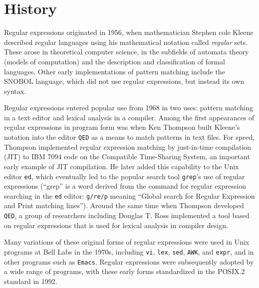 \chapter{History}
\label{chap:history}

Regular expressions originated in 1956, when mathematician Stephen
cole Kleene described regular languages using his mathematical
notation called \textsl{regular} sets. These arose in theoretical
computer science, in the subfields of automata theory (models of
computation) and the description and classification of formal
languages. Other early implementations of pattern matching include the
SNOBOL language, which did not use regular expressions, but instead
its own syntax.

Regular expressions entered popular use from 1968 in two uses: pattern
matching in a text editor and lexical analysis in a compiler. Among
the first appearances of regular expressions in program form was when
Ken Thompson built Kleene's notation into the editor \verb|QED| as a
means to match patterns in text files. For speed, Thompson implemented
regular expression matching by just-in-time compilation (JIT) to IBM
7094 code on the Compatible Time-Sharing System, an important early
example of JIT compilation. He later added this capability to the Unix
editor \verb|ed|, which eventually led to the popular search tool
\verb|grep|'s use of regular expressions (``grep'' is a word derived
from the command for regular expression searching in the \verb|ed|
editor: \verb|g/re/p| meaning ``Global search for Regular Expression
and Print matching lines''). Around the same time when Thompson
developed \verb|QED|, a group of researchers including Douglas T. Ross
implemented a tool based on regular expressions that is used for
lexical analysis in compiler design.

Many variations of these original forms of regular expressions were
used in Unix programs at Bell Labs in the 1970s, including \verb|vi|,
\verb|lex|, \verb|sed|, \verb|AWK|, and \verb|expr|, and in other
programs such as \verb|Emacs|. Regular expressions were subsequently
adopted by a wide range of programs, with these early forms
standardized in the POSIX.2 standard in 1992.

